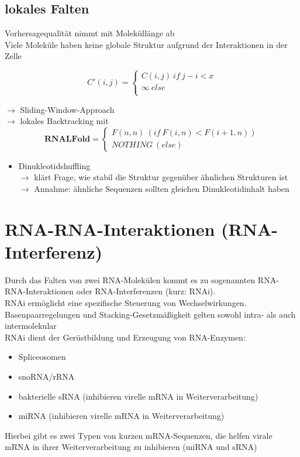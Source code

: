 \subsection{lokales Falten}

Vorhersagequalität nimmt mit Moleküllänge ab \\
Viele Moleküle haben keine globale Struktur aufgrund der Interaktionen in der Zelle

\begin{equation}
C'(i,j) =
\begin{cases}
C(i,j) \ if \ j-i<x \\
\infty \ else \\
\end{cases}
\end{equation}

$\rightarrow$ Sliding-Window-Approach \\

$\rightarrow$ lokales Backtracking mit 
\begin{equation}
\textbf{RNALFold} = 
\begin{cases}
F(n,n) \ (if \ F(i,n)<F(i+1,n)) \\
NOTHING \ (else)
\end{cases}
\end{equation}

\begin{itemize}
\item Dinukleotidshuffling \\ $\rightarrow$ klärt Frage, wie stabil die Struktur gegenüber ähnlichen Strukturen ist \\ $\rightarrow$ Annahme: ähnliche Sequenzen sollten gleichen Dinukleotidinhalt haben 
\end{itemize}

\section{RNA-RNA-Interaktionen (RNA-Interferenz)}
Durch das Falten von zwei RNA-Molekülen kommt es zu sogenannten RNA-RNA-Interaktionen oder RNA-Interferenzen (kurz: RNAi). \\
RNAi ermöglicht eine spezifische Steuerung von Wechselwirkungen. \\

Basenpaarregelungen und Stacking-Gesetzmäßigkeit gelten sowohl intra- als auch intermolekular \\

RNAi dient der Gerüstbildung und Erzeugung von RNA-Enzymen:
\begin{itemize}
\item Spliceosomen
\item snoRNA/rRNA
\item bakterielle sRNA (inhibieren virelle mRNA in Weiterverarbeitung)
\item miRNA (inhibieren virelle mRNA in Weiterverarbeitung)
\end{itemize}
Hierbei gibt es zwei Typen von kurzen mRNA-Sequenzen, die helfen virale mRNA in ihrer Weiterverarbeitung zu inhibieren (miRNA und sRNA) \\

